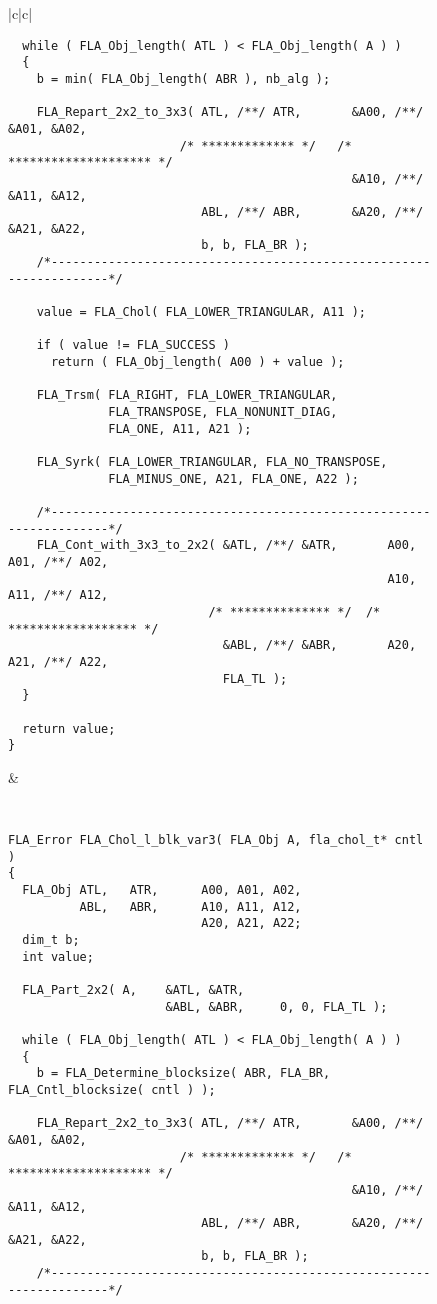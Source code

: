\begin{figure}[tbp]
\begin{center}
\begin{tabular}{|c|c|}
\begin{minipage}[t]{3in}
{\begin{verbatim}
  while ( FLA_Obj_length( ATL ) < FLA_Obj_length( A ) )
  {
    b = min( FLA_Obj_length( ABR ), nb_alg );

    FLA_Repart_2x2_to_3x3( ATL, /**/ ATR,       &A00, /**/ &A01, &A02,
                        /* ************* */   /* ******************** */
                                                &A10, /**/ &A11, &A12,
                           ABL, /**/ ABR,       &A20, /**/ &A21, &A22,
                           b, b, FLA_BR );
    /*-------------------------------------------------------------------*/

    value = FLA_Chol( FLA_LOWER_TRIANGULAR, A11 );

    if ( value != FLA_SUCCESS )
      return ( FLA_Obj_length( A00 ) + value );

    FLA_Trsm( FLA_RIGHT, FLA_LOWER_TRIANGULAR,
              FLA_TRANSPOSE, FLA_NONUNIT_DIAG,
              FLA_ONE, A11, A21 );

    FLA_Syrk( FLA_LOWER_TRIANGULAR, FLA_NO_TRANSPOSE,
              FLA_MINUS_ONE, A21, FLA_ONE, A22 );

    /*-------------------------------------------------------------------*/
    FLA_Cont_with_3x3_to_2x2( &ATL, /**/ &ATR,       A00, A01, /**/ A02,
                                                     A10, A11, /**/ A12,
                            /* ************** */  /* ****************** */
                              &ABL, /**/ &ABR,       A20, A21, /**/ A22,
                              FLA_TL );
  }

  return value;
}
\end{verbatim}
}
\end{minipage}
&
\begin{minipage}[t]{3in}
{\tt \tiny
\begin{verbatim}
FLA_Error FLA_Chol_l_blk_var3( FLA_Obj A, fla_chol_t* cntl )
{
  FLA_Obj ATL,   ATR,      A00, A01, A02,
          ABL,   ABR,      A10, A11, A12,
                           A20, A21, A22;
  dim_t b;
  int value;

  FLA_Part_2x2( A,    &ATL, &ATR,
                      &ABL, &ABR,     0, 0, FLA_TL );

  while ( FLA_Obj_length( ATL ) < FLA_Obj_length( A ) )
  {
    b = FLA_Determine_blocksize( ABR, FLA_BR, FLA_Cntl_blocksize( cntl ) );

    FLA_Repart_2x2_to_3x3( ATL, /**/ ATR,       &A00, /**/ &A01, &A02,
                        /* ************* */   /* ******************** */
                                                &A10, /**/ &A11, &A12,
                           ABL, /**/ ABR,       &A20, /**/ &A21, &A22,
                           b, b, FLA_BR );
    /*-------------------------------------------------------------------*/


\end{verbatim}}
\end{minipage}
\end{tabular}
\end{center}
\end{figure}
